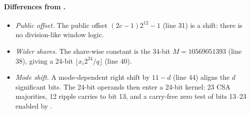 \paragraph{Differences from \PAMS{}.}
\begin{itemize}
  \item \emph{Public offset.} The public offset $(2c - 1)2^{12} - 1$ (line 31) is a shift: there is no division-like window logic.
  \item \emph{Wider shares.} The share-wise constant is the 34-bit $M = 10569051393$ (line 38), giving a 24-bit $\lfloor x_i 2^{24}/q \rfloor$ (line 40).
  \item \emph{Mode shift.} A mode-dependent right shift by $11 - d$ (line 44) aligns the $d$ significant bits. The 24-bit operands then enter a 24-bit kernel: 23 CSA majorities, 12 ripple carries to bit 13, and a carry-free zero test of bits 13--23 enabled by .
\end{itemize}
